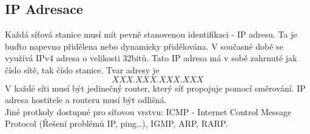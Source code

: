 \subsection{IP Adresace}
Každá síťová stanice musí mít pevně stanovenou identifikaci - IP adresu.
Ta je buďto napevno přidělena nebo dynamicky přidělována.
V současné době se využívá IPv4 adresa o velikosti 32bitů.
Tato IP adresa má v sobě zahrnuté jak číslo sítě, tak číslo stanice.
Tvar adresy je \[XXX.XXX.XXX.XXX\]
V každé síti musí být jedinečný router, který síť propojuje pomocí směrování. IP adresa hostitele a routeru musí být odlišná.\\
Jiné protkoly dostupné pro síťovou vrstvu: ICMP - Internet Control Message Protocol (Řešení problémů IP, ping\dots), IGMP, ARP, RARP.
